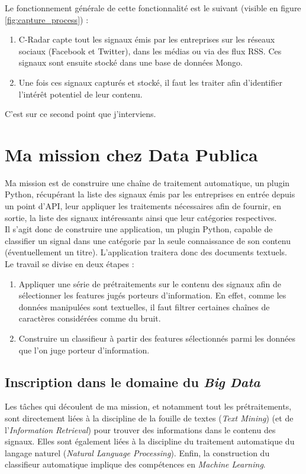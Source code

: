     Le fonctionnement générale de cette fonctionnalité est le suivant (visible en figure \ref{fig:capture_process}) :
    \begin{enumerate}
        \item C-Radar capte tout les signaux émis par les entreprises sur les réseaux sociaux (Facebook et Twitter), dans les médias ou via des flux RSS. Ces signaux sont ensuite stocké dans une base de données Mongo.
        \item Une fois ces signaux capturés et stocké, il faut les traiter afin d'identifier l'intérêt potentiel de leur contenu.
    \end{enumerate}
    C'est sur ce second point que j'interviens.

\section{Ma mission chez Data Publica} %
\label{sec:ma_mission_chez_data_publica}
    Ma mission est de construire une chaîne de traitement automatique, un plugin Python, récupérant la liste des signaux émis par les entreprises en entrée depuis un point d'API, leur appliquer les traitements nécessaires afin de fournir, en sortie, la liste des signaux intéressants ainsi que leur catégories respectives.\\

    Il s'agit donc de construire une application, un plugin Python, capable de classifier un signal dans une catégorie par la seule connaissance de son contenu (éventuellement un titre). L'application traitera donc des documents textuels.\\
    Le travail se divise en deux étapes :
    \begin{enumerate}
        \item Appliquer une série de prétraitements sur le contenu des signaux afin de sélectionner les features jugés porteurs d'information. En effet, comme les données manipulées sont textuelles, il faut filtrer certaines chaînes de caractères considérées comme du bruit.
        \item Construire un classifieur à partir des features sélectionnés parmi les données que l'on juge porteur d'information.
    \end{enumerate}

    \subsection{Inscription dans le domaine du \textit{Big Data}}
        Les tâches qui découlent de ma mission, et notamment tout les prétraitements, sont directement liées à la discipline de la fouille de textes (\textit{Text Mining}) (et de l'\textit{Information Retrieval}) pour trouver des informations dans le contenu des signaux. Elles sont également liées à la discipline du traitement automatique du langage naturel (\textit{Natural Language Processing}). Enfin, la construction du classifieur automatique implique des compétences en \textit{Machine Learning}.\\

